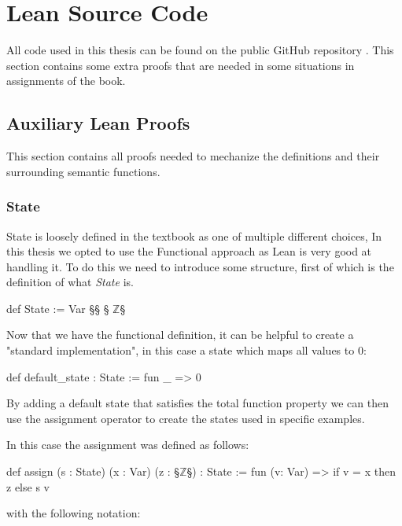 
\chapter{Lean Source Code}
All code used in this thesis can be found on the public GitHub repository \citep{bachelor_thesis_code_repo}.
This section contains some extra proofs that are needed in some situations in assignments of the book.

\section{Auxiliary Lean Proofs}
This section contains all proofs needed to mechanize the definitions and their surrounding semantic functions.


\subsection*{State}
\label{app:lean:state}
State is loosely defined in the textbook as one of multiple different choices,
In this thesis we opted to use the Functional approach as Lean is very good at handling it.
To do this we need to introduce some structure, first of which is the definition of what \emph{State} is.

\begin{Lean_Code}
def State := Var §\to§ § \(\mathbb{Z}\)§
\end{Lean_Code}
Now that we have the functional definition, it can be helpful to create a "standard implementation", in this case a state which maps all values to \(0\):

\begin{Lean_Code}
def default_state : State :=
  fun _ => 0
\end{Lean_Code}
By adding a default state that satisfies the total function property we can then use the assignment operator to create the states used in specific examples.

In this case the assignment was defined as follows:

\begin{Lean_Code}
def assign (s : State) (x : Var) (z : §\(\mathbb{Z}\)§) : State :=
  fun (v: Var) => if v = x then z else s v
\end{Lean_Code}
with the following notation:

